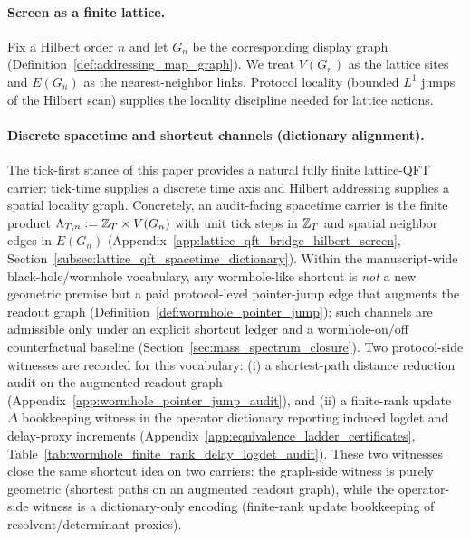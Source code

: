\paragraph{Screen as a finite lattice.}
Fix a Hilbert order $n$ and let $G_n$ be the corresponding display graph (Definition~\ref{def:addressing_map_graph}).
We treat $V(G_n)$ as the lattice sites and $E(G_n)$ as the nearest-neighbor links.
Protocol locality (bounded $L^1$ jumps of the Hilbert scan) supplies the locality discipline needed for lattice actions.

\paragraph{Discrete spacetime and shortcut channels (dictionary alignment).}
\InterfaceTag The tick-first stance of this paper provides a natural fully finite lattice-QFT carrier: tick-time supplies a discrete time axis and Hilbert addressing supplies a spatial locality graph.
Concretely, an audit-facing spacetime carrier is the finite product
$\Lambda_{T,n}:=\mathbb{Z}_T\times V(G_n)$ with unit tick steps in $\mathbb{Z}_T$ and spatial neighbor edges in $E(G_n)$ (Appendix~\ref{app:lattice_qft_bridge_hilbert_screen}, Section~\ref{subsec:lattice_qft_spacetime_dictionary}).
Within the manuscript-wide black-hole/wormhole vocabulary, any wormhole-like shortcut is \emph{not} a new geometric premise but a paid protocol-level pointer-jump edge that augments the readout graph (Definition~\ref{def:wormhole_pointer_jump}); such channels are admissible only under an explicit shortcut ledger and a wormhole-on/off counterfactual baseline (Section~\ref{sec:mass_spectrum_closure}).
\AuditTag Two protocol-side witnesses are recorded for this vocabulary: (i) a shortest-path distance reduction audit on the augmented readout graph (Appendix~\ref{app:wormhole_pointer_jump_audit}), and (ii) a finite-rank update $\Delta$ bookkeeping witness in the operator dictionary reporting induced logdet and delay-proxy increments (Appendix~\ref{app:equivalence_ladder_certificates}, Table~\ref{tab:wormhole_finite_rank_delay_logdet_audit}).
\AuditTag These two witnesses close the same shortcut idea on two carriers: the graph-side witness is purely geometric (shortest paths on an augmented readout graph), while the operator-side witness is a dictionary-only encoding (finite-rank update bookkeeping of resolvent/determinant proxies).

